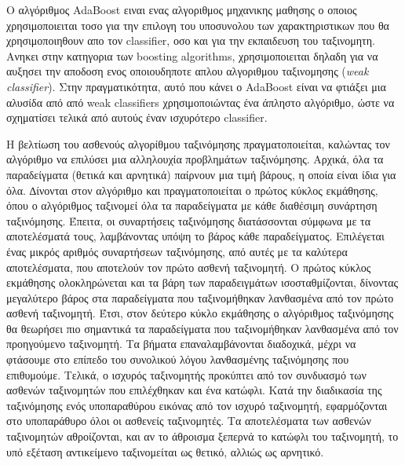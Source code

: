 Ο αλγόριθμος AdaBoost ειναι ενας αλγοριθμος μηχανικης μαθησης ο οποιος χρησιμοποιειται
τοσο για την επιλογη του υποσυνολου των χαρακτηριστικων που θα χρησιμοποιηθουν
απο τον classifier, οσο και για την εκπαιδευση του ταξινομητη. Ανηκει στην κατηγορια
των boosting algorithms, χρησιμοποιειται δηλαδη για να αυξησει την αποδοση ενος
οποιουδηποτε απλου αλγοριθμου ταξινομησης (\emph{weak classifier}). Στην πραγματικότητα,
αυτό που κάνει ο AdaBoost είναι να φτιάξει μια αλυσίδα από από weak classifiers
χρησιμοποιώντας ένα άπληστο αλγόριθμο, ώστε να σχηματίσει τελικά από αυτούς έναν
ισχυρότερο classifier.

Η βελτίωση του ασθενούς αλγορίθμου ταξινόμησης πραγματοποιείται, καλώντας τον
αλγόριθμο να επιλύσει μια αλληλουχία προβλημάτων ταξινόμησης. Αρχικά, όλα τα παραδείγματα
(θετικά και αρνητικά) παίρνουν μια τιμή βάρους, η οποία είναι ίδια για όλα. ∆ίνονται στον
αλγόριθμο και πραγματοποιείται ο πρώτος κύκλος εκμάθησης, όπου ο
αλγόριθμος ταξινομεί όλα τα παραδείγματα με κάθε διαθέσιμη συνάρτηση ταξινόμησης. Έπειτα,
οι συναρτήσεις ταξινόμησης διατάσσονται σύμφωνα με τα αποτελέσματά τους, λαμβάνοντας υπόψη
το βάρος κάθε παραδείγματος. Επιλέγεται ένας μικρός αριθμός συναρτήσεων ταξινόμησης, από
αυτές με τα καλύτερα αποτελέσματα, που αποτελούν τον πρώτο ασθενή ταξινομητή. Ο πρώτος
κύκλος εκμάθησης ολοκληρώνεται και τα βάρη των παραδειγμάτων ισοσταθμίζονται, δίνοντας
μεγαλύτερο βάρος στα παραδείγματα που ταξινομήθηκαν λανθασμένα από τον πρώτο ασθενή
ταξινομητή. Έτσι, στον δεύτερο κύκλο εκμάθησης ο αλγόριθμος ταξινόμησης θα θεωρήσει πιο
σημαντικά τα παραδείγματα που ταξινομήθηκαν λανθασμένα από τον προηγούμενο ταξινομητή.
Τα βήματα επαναλαμβάνονται διαδοχικά, μέχρι να φτάσουμε στο επίπεδο του συνολικού λόγου
λανθασμένης ταξινόμησης που επιθυμούμε. Τελικά, ο ισχυρός ταξινομητής προκύπτει από τον
συνδυασμό των ασθενών ταξινομητών που επιλέχθηκαν και ένα κατώφλι. Κατά την διαδικασία της
ταξινόμησης ενός υποπαραθύρου εικόνας από τον ισχυρό ταξινομητή, εφαρμόζονται στο
υποπαράθυρο όλοι οι ασθενείς ταξινομητές. Τα αποτελέσματα των ασθενών ταξινομητών
αθροίζονται, και αν το άθροισμα ξεπερνά το κατώφλι του ταξινομητή, το υπό εξέταση αντικείμενο
ταξινομείται ως θετικό, αλλιώς ως αρνητικό.


